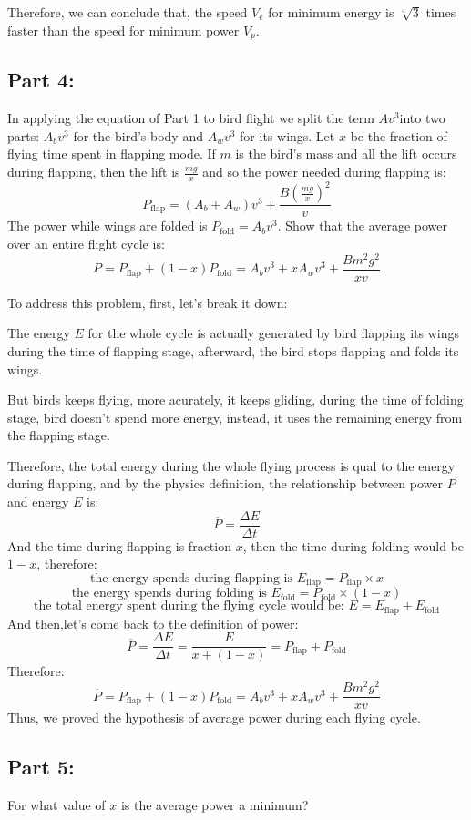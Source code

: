 \documentclass{article}
\begin{document}
Therefore, we can conclude that, the speed \(V_e\) for minimum energy is \(\sqrt[4]{3}\) times faster than the speed for minimum power \(V_p\).

\subsection*{Part 4:}
\label{sec:part4}
In applying the equation of Part 1 to bird flight we split the term \(Av^3\)into two
parts: \(A_bv^3\) for the bird’s body and \(A_wv^3\) for its wings. Let \(x\) be the fraction of flying time spent in flapping mode. If \(m\) is the bird’s mass and all the lift occurs during flapping, then the lift is \(\frac{mg}{x}\) and so the power needed during flapping is:
\[P_\text{flap} = (A_b+A_w)v^3+\frac{B(\frac{mg}{x})^2}{v}\]
The power while wings are folded is \(P_\text{fold}=A_bv^3\). Show that the average power over an entire flight cycle is:
\[\overline{P}=P_\text{flap}+(1-x)P_\text{fold} = A_bv^3+xA_wv^3+\frac{Bm^2g^2}{xv}\]

To address this problem, first, let's break it down:

 The energy \(E\) for the whole cycle is actually generated by bird flapping its wings during the time of flapping stage, afterward, the bird stops flapping and folds its wings.

 But birds keeps flying, more acurately, it keeps gliding, during the time of folding stage, bird doesn't spend more energy, instead, it uses the remaining energy from the flapping stage.

Therefore, the total energy during the whole flying process is qual to the energy during flapping, and by the physics definition, the relationship between power \(P\) and energy \(E\) is:
\[\overline{P}=\frac{\Delta E}{\Delta t}\]
And the time during flapping is fraction \(x\), then the time during folding would be \(1-x\), therefore:
\[\text{the energy spends during flapping is } E_\text{flap} =P_\text{flap}\times  x \]
\[\text{the energy spends during folding is } E_\text{fold} = P_\text{fold}\times (1-x)\] 
\[\text{the total energy spent during the flying cycle would be: }E = E_\text{flap} +E_\text{fold} \]
And then,let's come back to the definition of power:
 \[\overline{P}=\frac{\Delta E}{\Delta t}=\frac{E}{x+(1-x)}=P_\text{flap} + P_\text{fold}\]
 Therefore:
\[\overline{P}=P_\text{flap}+(1-x)P_\text{fold} = A_bv^3+xA_wv^3+\frac{Bm^2g^2}{xv}\]
Thus, we proved the hypothesis of average power during each flying cycle.


\subsection*{Part 5:}
For what value of \(x\) is the average power a minimum?
\setlength{\parskip}{1em}
\end{document}
